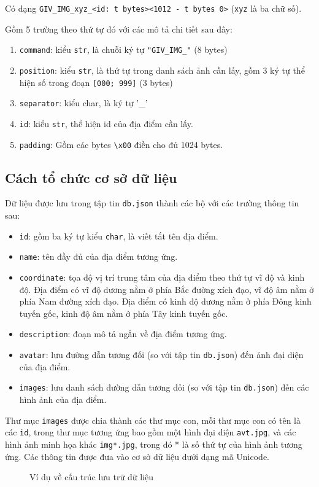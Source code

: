 \begin{enumerate}
\begin{enumerate}
Có dạng \texttt{GIV{\_}IMG{\_}xyz{\_}<id: t bytes><1012 - t bytes 0>} (\texttt{xyz} là ba chữ số).

Gồm 5 trường theo thứ tự đó với các mô tả chi tiết sau đây:

\begin{enumerate}
\item \texttt{command}: kiểu \texttt{str}, là chuỗi ký tự \texttt{"GIV{\_}IMG{\_}"} (8 bytes)
\item \texttt{position}: kiểu \texttt{str}, là thứ tự trong danh sách ảnh cần lấy, gồm 3 ký tự thể hiện số trong đoạn \texttt{[000; 999]} (3 bytes)
\item \texttt{separator}: kiểu char, là ký tự '{\_}'
\item \texttt{id}: kiểu \texttt{str}, thể hiện id của địa điểm cần lấy.
\item \texttt{padding}: Gồm các bytes \texttt{\textbackslash x00} điền cho đủ 1024 bytes.
\end{enumerate}
\end{enumerate}
\end{enumerate}
\subsection{Cách tổ chức cơ sở dữ liệu}
Dữ liệu được lưu trong tập tin \texttt{db.json} thành các bộ với các trường thông tin sau:
\begin{itemize}
\item \texttt{id}: gồm ba ký tự kiểu \texttt{char}, là viết tắt tên địa điểm.
\item \texttt{name}: tên đầy đủ của địa điểm tương ứng.
\item \texttt{coordinate}: tọa độ vị trí trung tâm của địa điểm theo thứ tự vĩ độ và kinh độ. Địa điểm có vĩ độ dương nằm ở phía Bắc đường xích đạo, vĩ độ âm nằm ở phía Nam đường xích đạo. Địa điểm có kinh độ dương nằm ở phía Đông kinh tuyến gốc, kinh độ âm nằm ở phía Tây kinh tuyến gốc.
\item \texttt{description}: đoạn mô tả ngắn về địa điểm tương ứng.
\item \texttt{avatar}: lưu đường dẫn tương đối (so với tập tin \texttt{db.json}) đến ảnh đại diện của địa điểm.
\item \texttt{images}: lưu danh sách đường dẫn tương đối (so với tập tin \texttt{db.json}) đến các hình ảnh của địa điểm.
\end{itemize}
Thư mục \texttt{images} được chia thành các thư mục con, mỗi thư mục con có tên là các \texttt{id}, trong thư mục tương ứng bao gồm một hình đại diện \texttt{avt.jpg}, và các hình ảnh minh họa khác \texttt{img*.jpg}, trong đó * là số thứ tự của hình ảnh tương ứng.
Các thông tin được đưa vào cơ sở dữ liệu dưới dạng mã Unicode.
\begin{figure}[H]
\caption{Ví dụ về cấu trúc lưu trữ dữ liệu}
\end{figure}

